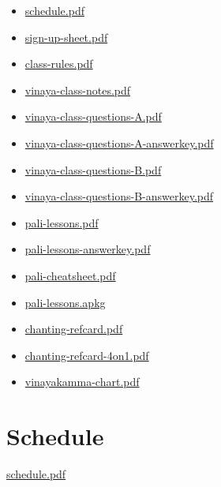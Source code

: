 \begin{itemize}
\tightlist
\item
  \href{./includes/docs/schedule.pdf}{schedule.pdf}
\item
  \href{./includes/docs/sign-up-sheet.pdf}{sign-up-sheet.pdf}
\item
  \href{./includes/docs/class-rules.pdf}{class-rules.pdf}
\item
  \href{./includes/docs/vinaya-class-notes.pdf}{vinaya-class-notes.pdf}
\item
  \href{./includes/docs/vinaya-class-questions-A.pdf}{vinaya-class-questions-A.pdf}
\item
  \href{./includes/docs/vinaya-class-questions-A-answerkey.pdf}{vinaya-class-questions-A-answerkey.pdf}
\item
  \href{./includes/docs/vinaya-class-questions-B.pdf}{vinaya-class-questions-B.pdf}
\item
  \href{./includes/docs/vinaya-class-questions-B-answerkey.pdf}{vinaya-class-questions-B-answerkey.pdf}
\item
  \href{./includes/docs/pali-lessons.pdf}{pali-lessons.pdf}
\item
  \href{./includes/docs/pali-lessons-answerkey.pdf}{pali-lessons-answerkey.pdf}
\item
  \href{./includes/docs/pali-cheatsheet.pdf}{pali-cheatsheet.pdf}
\item
  \href{./includes/docs/pali-lessons.apkg}{pali-lessons.apkg}
\item
  \href{./includes/docs/chanting-refcard.pdf}{chanting-refcard.pdf}
\item
  \href{./includes/docs/chanting-refcard-4on1.pdf}{chanting-refcard-4on1.pdf}
\item
  \href{./includes/docs/vinayakamma-chart.pdf}{vinayakamma-chart.pdf}
\end{itemize}

\section{Schedule}

\href{./includes/docs/schedule.pdf}{schedule.pdf}

